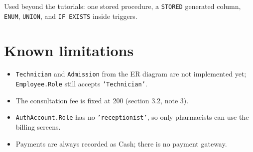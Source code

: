\documentclass[11pt,a4paper]{article}
\newcommand{\code}[1]{\texttt{#1}}
\begin{document}
Used beyond the tutorials: one stored procedure, a \code{STORED} generated column, \code{ENUM}, \code{UNION}, and \code{IF EXISTS} inside triggers.

\section{Known limitations}

\begin{itemize}
  \item \code{Technician} and \code{Admission} from the ER diagram are not implemented yet; \code{Employee.Role} still accepts \code{'Technician'}.
  \item The consultation fee is fixed at 200 (section 3.2, note 3).
  \item \code{AuthAccount.Role} has no \code{'receptionist'}, so only pharmacists can use the billing screens.
  \item Payments are always recorded as Cash; there is no payment gateway.
\end{itemize}
\end{document}
